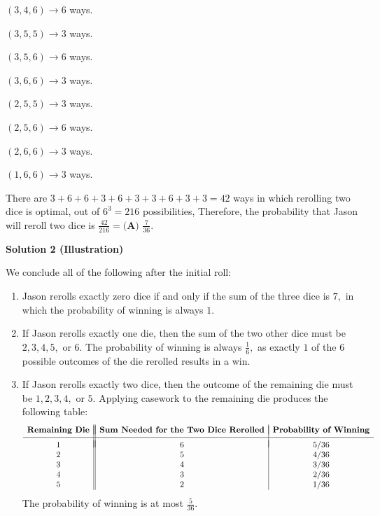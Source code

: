 \begin{enumerate}
 $(3, 4, 6) \rightarrow 6$ ways.

 $(3, 5, 5) \rightarrow 3$ ways.

 $(3, 5, 6) \rightarrow 6$ ways.

 $(3, 6, 6) \rightarrow 3$ ways.

 $(2, 5, 5) \rightarrow 3$ ways.

 $(2, 5, 6) \rightarrow 6$ ways.

 $(2, 6, 6) \rightarrow 3$ ways.

 $(1, 6, 6) \rightarrow 3$ ways.

 There are $3 + 6 + 6 + 3 + 6 + 3 + 3 + 6 + 3 + 3 = 42$ ways in which rerolling two dice is optimal, out of $6^3 = 216$ possibilities, Therefore, the probability that Jason will reroll two dice is $\frac{42}{216} = \boxed{\textbf{(A) } \frac{7}{36}}$.

 



\textbf{Solution 2 (Illustration)}

We conclude all of the following after the initial roll:

 
            \begin{enumerate} 
        \item Jason rerolls exactly zero dice if and only if the sum of the three dice is $7,$ in which the probability of winning is always $1.$

        \item If Jason rerolls exactly one die, then the sum of the two other dice must be $2,3,4,5,$ or $6.$ The probability of winning is always $\frac16,$ as exactly $1$ of the $6$ possible outcomes of the die rerolled results in a win. 

        \item If Jason rerolls exactly two dice, then the outcome of the remaining die must be $1,2,3,4,$ or $5.$ Applying casework to the remaining die produces the following table:
 \[\begin{array}{c||c|c} & & \\ [-2.5ex] \textbf{Remaining Die} & \textbf{Sum Needed for the Two Dice Rerolled} & \textbf{Probability of Winning} \\ [0.5ex] \hline & & \\ [-2ex] 1 & 6 & 5/36 \\ 2 & 5 & 4/36 \\ 3 & 4 & 3/36 \\ 4 & 3 & 2/36 \\ 5 & 2 & 1/36 \end{array}\]The probability of winning is at most $\frac{5}{36}.$


\end{enumerate}
\end{enumerate}
